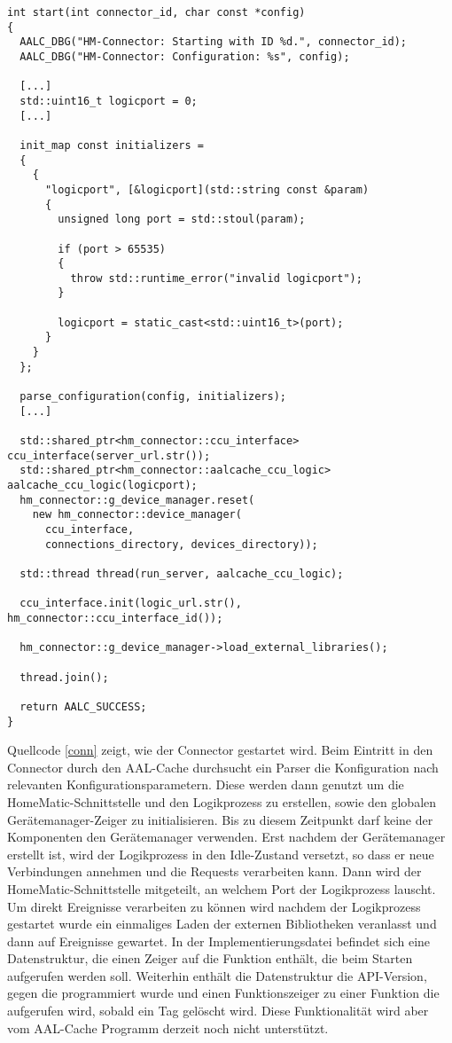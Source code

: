 \lstset{language=C++}
\begin{lstlisting}[frame=single,caption={Ausschnitt der Eintrittsfunktion des Connectors},label=conn]
int start(int connector_id, char const *config)
{
  AALC_DBG("HM-Connector: Starting with ID %d.", connector_id);
  AALC_DBG("HM-Connector: Configuration: %s", config);

  [...]
  std::uint16_t logicport = 0;
  [...]

  init_map const initializers =
  {
    {
      "logicport", [&logicport](std::string const &param)
      {
        unsigned long port = std::stoul(param);

        if (port > 65535)
        {
          throw std::runtime_error("invalid logicport");
        }

        logicport = static_cast<std::uint16_t>(port);
      }
    }
  };

  parse_configuration(config, initializers);
  [...]

  std::shared_ptr<hm_connector::ccu_interface> ccu_interface(server_url.str());
  std::shared_ptr<hm_connector::aalcache_ccu_logic> aalcache_ccu_logic(logicport);
  hm_connector::g_device_manager.reset(
    new hm_connector::device_manager(
      ccu_interface,
      connections_directory, devices_directory));

  std::thread thread(run_server, aalcache_ccu_logic);

  ccu_interface.init(logic_url.str(), hm_connector::ccu_interface_id());

  hm_connector::g_device_manager->load_external_libraries();

  thread.join();

  return AALC_SUCCESS;
}
\end{lstlisting}

Quellcode \ref{conn} zeigt, wie der Connector gestartet wird.
Beim Eintritt in den Connector durch den AAL-Cache durchsucht ein Parser die Konfiguration nach relevanten
Konfigurationsparametern.
Diese werden dann genutzt um die HomeMatic-Schnittstelle und den Logikprozess zu erstellen, sowie
den globalen Gerätemanager-Zeiger zu initialisieren.
Bis zu diesem Zeitpunkt darf keine der Komponenten den Gerätemanager verwenden.
Erst nachdem der Gerätemanager erstellt ist, wird der Logikprozess in den Idle-Zustand versetzt, so
dass er neue Verbindungen annehmen und die Requests verarbeiten kann.
Dann wird der HomeMatic-Schnittstelle mitgeteilt, an welchem Port der Logikprozess lauscht.
Um direkt Ereignisse verarbeiten zu können wird nachdem der Logikprozess gestartet wurde ein
einmaliges Laden der externen Bibliotheken veranlasst und dann auf Ereignisse gewartet.
In der Implementierungsdatei befindet sich eine Datenstruktur, die einen Zeiger auf die Funktion enthält,
die beim Starten aufgerufen werden soll.
Weiterhin enthält die Datenstruktur die API-Version, gegen die programmiert wurde und einen Funktionszeiger
zu einer Funktion die aufgerufen wird, sobald ein Tag gelöscht wird.
Diese Funktionalität wird aber vom AAL-Cache Programm derzeit noch nicht unterstützt.

